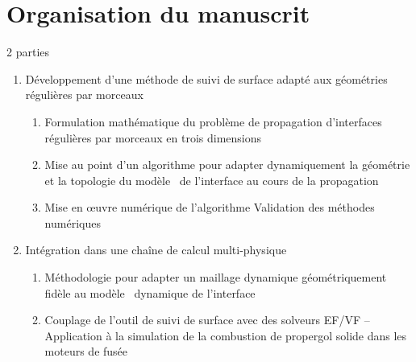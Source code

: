 \section*{Organisation du manuscrit}
2 parties
\begin{enumerate}
	\item Développement d'une méthode de suivi de surface adapté aux géométries régulières par morceaux
	\begin{enumerate}
		\item Formulation mathématique du problème de propagation d'interfaces régulières par morceaux en trois dimensions
		\item Mise au point d'un algorithme pour adapter dynamiquement la géométrie et la topologie du modèle \brep\ de l'interface au cours de la propagation
		\item Mise en \oe uvre numérique de l'algorithme
		\itme Validation des méthodes numériques
	\end{enumerate}
	
	\item Intégration dans une chaîne de calcul multi-physique
	\begin{enumerate}
		\item Méthodologie pour adapter un maillage dynamique géométriquement fidèle au modèle \brep\ dynamique de l'interface
		\item Couplage de l'outil de suivi de surface avec des solveurs EF/VF -- Application à la simulation de la combustion de propergol solide dans les moteurs de fusée
	\end{enumerate}
\end{enumerate}